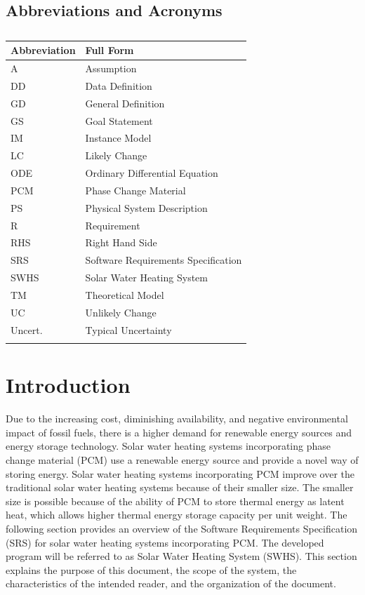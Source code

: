\documentclass[12pt]{article}
\begin{document}
\subsection{Abbreviations and Acronyms}
\label{Sec:TAbbAcc}
\begin{longtable}{l l}
\toprule
\textbf{Abbreviation} & \textbf{Full Form}
\\
\midrule
\endhead
A & Assumption
\\
DD & Data Definition
\\
GD & General Definition
\\
GS & Goal Statement
\\
IM & Instance Model
\\
LC & Likely Change
\\
ODE & Ordinary Differential Equation
\\
PCM & Phase Change Material
\\
PS & Physical System Description
\\
R & Requirement
\\
RHS & Right Hand Side
\\
SRS & Software Requirements Specification
\\
SWHS & Solar Water Heating System
\\
TM & Theoretical Model
\\
UC & Unlikely Change
\\
Uncert. & Typical Uncertainty
\\
\bottomrule
\caption{}
\label{Table:TAbbAcc}
\end{longtable}
\section{Introduction}
\label{Sec:Intro}
Due to the increasing cost, diminishing availability, and negative environmental impact of fossil fuels, there is a higher demand for renewable energy sources and energy storage technology. Solar water heating systems incorporating phase change material (PCM) use a renewable energy source and provide a novel way of storing energy. Solar water heating systems incorporating PCM improve over the traditional solar water heating systems because of their smaller size. The smaller size is possible because of the ability of PCM to store thermal energy as latent heat, which allows higher thermal energy storage capacity per unit weight.
The following section provides an overview of the Software Requirements Specification (SRS) for solar water heating systems incorporating PCM. The developed program will be referred to as Solar Water Heating System (SWHS). This section explains the purpose of this document, the scope of the system, the characteristics of the intended reader, and the organization of the document.
\end{document}
